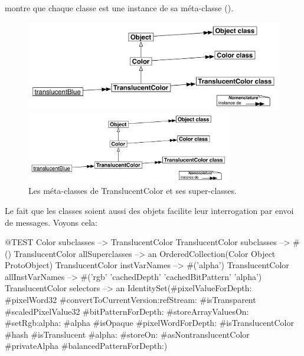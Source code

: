 \documentclass[a4paper,10pt,twoside]{book}
\begin{document}
\noindent
{} montre que chaque classe est une instance de sa méta-classe ().

\begin{center}
\begin{figure}[!ht]
\ifluluelse
	{\centerline {\includegraphics[width=\textwidth]{TranslucentMetaclasses}}}
	{\centerline {\includegraphics[width=0.8\textwidth]{TranslucentMetaclasses}}}
\caption{Les méta-classes de TranslucentColor et ses super-classes.}
\end{figure}
\end{center}


Le fait que les classes soient aussi des objets facilite leur interrogation par envoi de messages.
Voyons cela:
\begin{code}{@TEST}
Color subclasses                           --> {TranslucentColor}
TranslucentColor subclasses         --> #()
TranslucentColor allSuperclasses  --> an OrderedCollection(Color Object ProtoObject)
TranslucentColor instVarNames     --> #('alpha')
TranslucentColor allInstVarNames --> #('rgb' 'cachedDepth' 'cachedBitPattern' 'alpha')
TranslucentColor selectors             -->  an IdentitySet(#pixelValueForDepth: #pixelWord32
#convertToCurrentVersion:refStream: #isTransparent #scaledPixelValue32 #bitPatternForDepth: #storeArrayValuesOn: #setRgb:alpha: #alpha #isOpaque #pixelWordForDepth: #isTranslucentColor #hash #isTranslucent #alpha: #storeOn: #asNontranslucentColor #privateAlpha #balancedPatternForDepth:)
\end{code}
\end{document}
